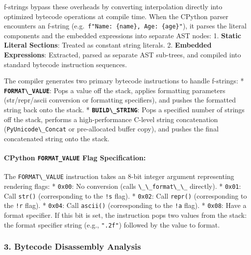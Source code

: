 f-strings bypass these overheads by converting interpolation directly
into optimized bytecode operations at compile time. When the CPython
parser encounters an f-string
(e.g.~\passthrough{\lstinline!f"Name: \{name\}, Age: \{age\}"!}), it
parses the literal components and the embedded expressions into separate
AST nodes: 1. \textbf{Static Literal Sections}: Treated as constant
string literals. 2. \textbf{Embedded Expressions}: Extracted, parsed as
separate AST sub-trees, and compiled into standard bytecode instruction
sequences.

The compiler generates two primary bytecode instructions to handle
f-strings: * \textbf{\passthrough{\lstinline!FORMAT\_VALUE!}}: Pops a
value off the stack, applies formatting parameters (str/repr/ascii
conversion or formatting specifiers), and pushes the formatted string
back onto the stack. * \textbf{\passthrough{\lstinline!BUILD\_STRING!}}:
Pops a specified number of strings off the stack, performs a
high-performance C-level string concatenation
(\passthrough{\lstinline!PyUnicode\_Concat!} or pre-allocated buffer
copy), and pushes the final concatenated string onto the stack.

\hypertarget{cpython-format_value-flag-specification}{%
\paragraph{\texorpdfstring{CPython \texttt{FORMAT\_VALUE} Flag
Specification:}{CPython FORMAT\_VALUE Flag Specification:}}\label{cpython-format_value-flag-specification}}

The \passthrough{\lstinline!FORMAT\_VALUE!} instruction takes an 8-bit
integer argument representing rendering flags: *
\passthrough{\lstinline!0x00!}: No conversion (calls
\passthrough{\lstinline!\_\_format\_\_!} directly). *
\passthrough{\lstinline!0x01!}: Call \passthrough{\lstinline!str()!}
(corresponding to the \passthrough{\lstinline"!s"} flag). *
\passthrough{\lstinline!0x02!}: Call \passthrough{\lstinline!repr()!}
(corresponding to the \passthrough{\lstinline"!r"} flag). *
\passthrough{\lstinline!0x04!}: Call \passthrough{\lstinline!ascii()!}
(corresponding to the \passthrough{\lstinline"!a"} flag). *
\passthrough{\lstinline!0x08!}: Have a format specifier. If this bit is
set, the instruction pops two values from the stack: the format
specifier string (e.g., \passthrough{\lstinline!".2f"!}) followed by the
value to format.

\hypertarget{bytecode-disassembly-analysis}{%
\subsubsection{3. Bytecode Disassembly
Analysis}\label{bytecode-disassembly-analysis}}

